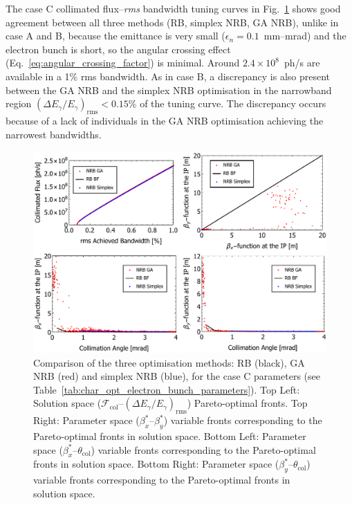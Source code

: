 \documentclass[../main.tex]{subfiles}
\begin{document}
The case C collimated flux--\textit{rms} bandwidth tuning curves in Fig.~\ref{fig:case_C_optimisation_comparision} shows good agreement between all three methods (RB, simplex NRB, GA NRB), unlike in case A and B, because the emittance is very small ($\epsilon_{n} = 0.1$~\si{\milli\meter}--\si{\milli\radian}) and the electron bunch is short, so the angular crossing effect (Eq.~\ref{eq:angular_crossing_factor}) is minimal. Around $2.4\times 10^{8}$~ph/\si{\second} are available in a 1\% rms bandwidth. As in case B, a discrepancy is also present between the GA NRB and the simplex NRB optimisation in the narrowband region $\left(\Delta E_{\gamma}/E_{\gamma}\right)_{\mathrm{rms}} < 0.15$\% of the tuning curve. The discrepancy occurs because of a lack of individuals in the GA NRB optimisation achieving the narrowest bandwidths.       

\begin{figure}[!h]
\centering
\includegraphics[width=\textwidth]{Figures/Optimisation_and_Characterisation_of_Inverse_Compton_Scattering_Sources/CaseCoptcomp.pdf}
\caption{Comparison of the three optimisation methods: RB (black), GA NRB (red) and simplex NRB (blue), for the case C parameters (see Table~\ref{tab:char_opt_electron_bunch_parameters}). Top Left: Solution space ($\mathcal{F}_{\mathrm{col}}$--$\left(\Delta E_{\gamma}/E_{\gamma}\right)_{\mathrm{rms}}$) Pareto-optimal fronts. Top Right: Parameter space ($\beta_{x}^{*}$--$\beta_{y}^{*}$) variable fronts corresponding to the Pareto-optimal fronts in solution space. Bottom Left: Parameter space ($\beta_{x}^{*}$--$\theta_{\mathrm{col}}$) variable fronts corresponding to the Pareto-optimal fronts in solution space. Bottom Right: Parameter space ($\beta_{y}^{*}$--$\theta_{\mathrm{col}}$) variable fronts corresponding to the Pareto-optimal fronts in solution space.}
\label{fig:case_C_optimisation_comparision}
\end{figure}
\end{document}
